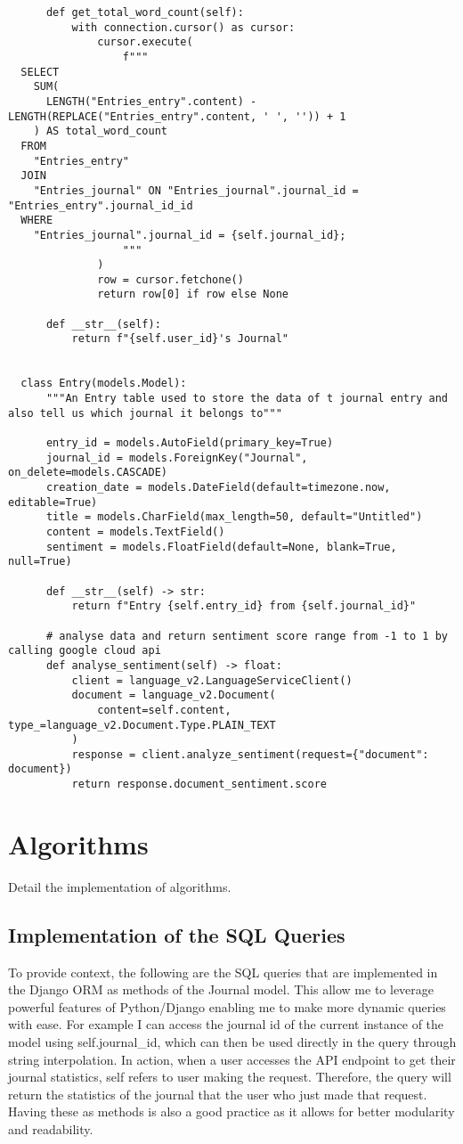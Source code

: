 \begin{verbatim}
      def get_total_word_count(self):
          with connection.cursor() as cursor:
              cursor.execute(
                  f"""
  SELECT
    SUM(
      LENGTH("Entries_entry".content) - LENGTH(REPLACE("Entries_entry".content, ' ', '')) + 1
    ) AS total_word_count
  FROM
    "Entries_entry"
  JOIN
    "Entries_journal" ON "Entries_journal".journal_id = "Entries_entry".journal_id_id
  WHERE
    "Entries_journal".journal_id = {self.journal_id};
                  """
              )
              row = cursor.fetchone()
              return row[0] if row else None
  
      def __str__(self):
          return f"{self.user_id}'s Journal"
  
  
  class Entry(models.Model):
      """An Entry table used to store the data of t journal entry and also tell us which journal it belongs to"""
  
      entry_id = models.AutoField(primary_key=True)
      journal_id = models.ForeignKey("Journal", on_delete=models.CASCADE)
      creation_date = models.DateField(default=timezone.now, editable=True)
      title = models.CharField(max_length=50, default="Untitled")
      content = models.TextField()
      sentiment = models.FloatField(default=None, blank=True, null=True)
  
      def __str__(self) -> str:
          return f"Entry {self.entry_id} from {self.journal_id}"
  
      # analyse data and return sentiment score range from -1 to 1 by calling google cloud api
      def analyse_sentiment(self) -> float:
          client = language_v2.LanguageServiceClient()
          document = language_v2.Document(
              content=self.content, type_=language_v2.Document.Type.PLAIN_TEXT
          )
          response = client.analyze_sentiment(request={"document": document})
          return response.document_sentiment.score
\end{verbatim}



\section{Algorithms}
Detail the implementation of algorithms.

\subsection{Implementation of the SQL Queries}
To provide context, the following are the SQL queries that are implemented in the Django ORM as methods of the Journal model. This allow me to leverage powerful features of Python/Django enabling me to make more dynamic queries with ease. For example I can access the journal id of the current instance of the model using self.journal\_id, which can then be used directly in the query through string interpolation. In action, when a user accesses the API endpoint to get their journal statistics, self refers to user making the request. Therefore, the query will return the statistics of the journal that the user who just made that request. Having these as methods is also a good practice as it allows for better modularity and readability.


